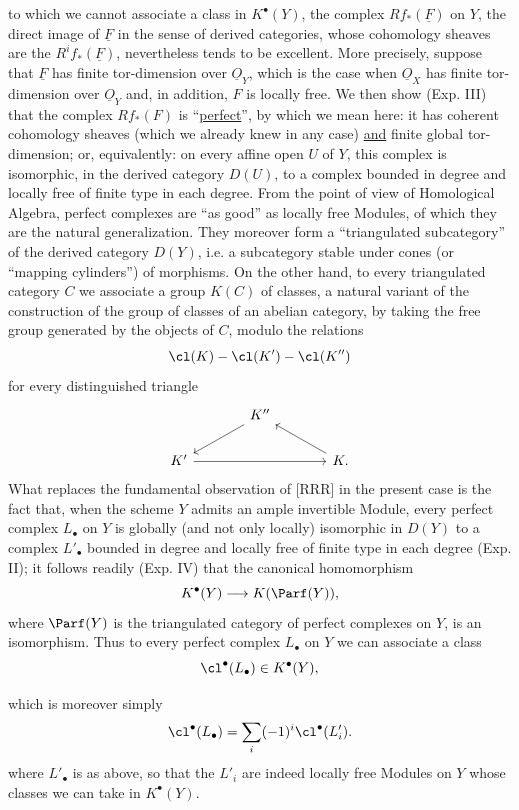 to which we cannot associate a class in $K^\bullet(Y)$, the complex $Rf_*(\underline F)$ on $Y$, the direct image of $\underline F$ in the sense of derived categories, whose cohomology sheaves are the $R^if_*(\underline F)$, nevertheless tends to be excellent. More precisely, suppose that $\underline F$ has finite tor-dimension over $\underline O_Y$, which is the case when $\underline O_X$ has finite tor-dimension over $\underline O_Y$ and, in addition, $F$ is locally free. We then show (Exp. III) that the complex $Rf_*(F)$ is ``\underline{perfect}'', by which we mean here: it has coherent cohomology sheaves (which we already knew in any case) \underline{and} finite global tor-dimension; or, equivalently: on every affine open $U$ of $Y$, this complex is isomorphic, in the derived category $D(U)$, to a complex bounded in degree and locally free of finite type in each degree. From the point of view of Homological Algebra, perfect complexes are ``as good'' as locally free Modules, of which they are the natural generalization. They moreover form a ``triangulated subcategory'' of the derived category $D(Y)$, i.e. a subcategory stable under cones (or ``mapping cylinders'') of morphisms. On the other hand, to every triangulated category $C$ we associate a group $K(C)$ of classes, a natural variant of the construction of the group of classes of an abelian category, by taking the free group generated by the objects of $C$, modulo the relations
\[
\cl(K)-\cl(K')-\cl(K'')
\]
for every distinguished triangle
\[
\begin{tikzcd}[column sep=large]
 & K'' \arrow[dl] & \\
K' \arrow[rr] & & K \arrow[ul] .
\end{tikzcd}
\]
What replaces the fundamental observation of [RRR] in the present case is the fact that, when the scheme $Y$ admits an ample invertible Module, every perfect complex $L_\bullet$ on $Y$ is globally (and not only locally) isomorphic in $D(Y)$ to a complex $L'_\bullet$ bounded in degree and locally free of finite type in each degree (Exp. II); it follows readily (Exp. IV) that the canonical homomorphism
\[
K^\bullet(Y)\longrightarrow K(\Parf(Y)),
\]
where $\Parf(Y)$ is the triangulated category of perfect complexes on $Y$, is an isomorphism. Thus to every perfect complex $L_\bullet$ on $Y$ we can associate a class
\[
\cl^\bullet(L_\bullet)\in K^\bullet(Y),
\]

which is moreover simply
\[
\cl^\bullet(L_\bullet)=\sum_i(-1)^i\cl^\bullet(L'_i).
\]
where $L'_\bullet$ is as above, so that the $L'_i$ are indeed locally free Modules on $Y$ whose classes we can take in $K^\bullet(Y)$.

